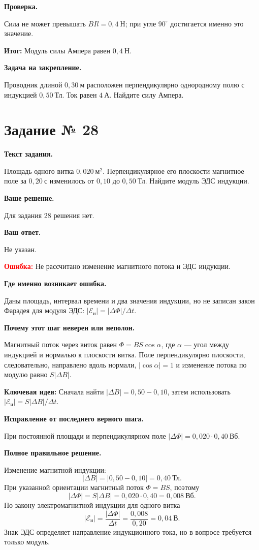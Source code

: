 \documentclass[11pt,a4paper]{article}
\newcommand{\reviewblock}[2]{\par\medskip\noindent\textbf{#1}\par\noindent#2\par}
\newcommand{\errorblock}[1]{\par\medskip\noindent\textcolor{red}{\textbf{Ошибка:}} #1\par}
\newcommand{\ideablock}[1]{\par\medskip\noindent\textcolor{blue!60!black}{\textbf{Ключевая идея:}} #1\par}
\newcommand{\resultblock}[1]{\par\medskip\noindent\textcolor{teal!60!black}{\textbf{Итог:}} #1\par}
\begin{document}
\reviewblock{Проверка.}{Сила не может превышать $BIl=0{,}4\ \text{Н}$; при угле $90^\circ$ достигается именно это значение.}

\resultblock{Модуль силы Ампера равен $0{,}4\ \text{Н}$.}

\reviewblock{Задача на закрепление.}{Проводник длиной $0{,}30\ \text{м}$ расположен перпендикулярно однородному полю с индукцией $0{,}50\ \text{Тл}$. Ток равен $4\ \text{А}$. Найдите силу Ампера.}
\newpage
{}\label{task:28}

\section*{Задание № 28}

\reviewblock{Текст задания.}{Площадь одного витка $0{,}020\ \text{м}^2$. Перпендикулярное его плоскости магнитное поле за $0{,}20\ \text{с}$ изменилось от $0{,}10$ до $0{,}50\ \text{Тл}$. Найдите модуль ЭДС индукции.}

\reviewblock{Ваше решение.}{Для задания 28 решения нет.}

\reviewblock{Ваш ответ.}{Не указан.}

\errorblock{Не рассчитано изменение магнитного потока и ЭДС индукции.}

\reviewblock{Где именно возникает ошибка.}{Даны площадь, интервал времени и два значения индукции, но не записан закон Фарадея для модуля ЭДС: $|\mathcal{E}_{\text{и}}|=|\Delta\Phi|/\Delta t$.}

\reviewblock{Почему этот шаг неверен или неполон.}{Магнитный поток через виток равен $\Phi=BS\cos\alpha$, где $\alpha$ --- угол между индукцией и нормалью к плоскости витка. Поле перпендикулярно плоскости, следовательно, направлено вдоль нормали, $|\cos\alpha|=1$ и изменение потока по модулю равно $S|\Delta B|$.}

\ideablock{Сначала найти $|\Delta B|=0{,}50-0{,}10$, затем использовать $|\mathcal{E}_{\text{и}}|=S|\Delta B|/\Delta t$.}

\reviewblock{Исправление от последнего верного шага.}{При постоянной площади и перпендикулярном поле $|\Delta\Phi|=0{,}020\cdot0{,}40\ \text{Вб}$.}

\reviewblock{Полное правильное решение.}{Изменение магнитной индукции:
\[|\Delta B|=|0{,}50-0{,}10|=0{,}40\ \text{Тл}.\]
При указанной ориентации магнитный поток $\Phi=BS$, поэтому
\[|\Delta\Phi|=S|\Delta B|=0{,}020\cdot0{,}40=0{,}008\ \text{Вб}.\]
По закону электромагнитной индукции для одного витка
\[|\mathcal{E}_{\text{и}}|=\frac{|\Delta\Phi|}{\Delta t}=\frac{0{,}008}{0{,}20}=0{,}04\ \text{В}.\]
Знак ЭДС определяет направление индукционного тока, но в вопросе требуется только модуль.}
\end{document}
